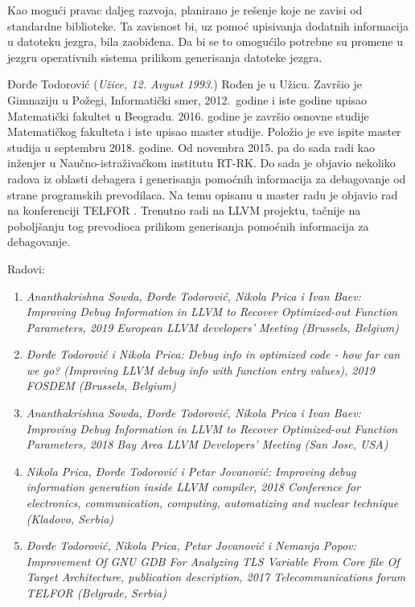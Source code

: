 \documentclass[12pt,oneside]{memoir}
\begin{document}
Kao mogući pravac daljeg razvoja, planirano je rešenje koje ne zavisi od standardne biblioteke. Ta zavisnost bi, uz pomoć upisivanja dodatnih informacija u datoteku jezgra, bila zaobiđena. Da bi se to omogućilo potrebne su promene u jezgru operativnih sistema prilikom generisanja datoteke jezgra.

\literatura

\backmatter

\begin{biografija}
Đorđe Todorović (\emph{Užice, 12. Avgust 1993.}) Rođen je u Užicu. Završio je Gimnaziju u Požegi, Informatički smer, 2012.~godine i iste godine upisao Matematički fakultet u Beogradu. 2016. godine je završio osnovne studije Matematičkog fakulteta i iste upisao master studije. Položio je sve ispite master studija u septembru 2018. godine. Od novembra 2015. pa do sada radi kao inženjer u Naučno-istraživačkom institutu RT-RK. Do sada je objavio nekoliko radova iz oblasti debagera i generisanja pomoćnih informacija za debagovanje od strane programskih prevodilaca. Na temu opisanu u master radu je objavio rad na konferenciji TELFOR \cite{TELFOR}. Trenutno radi na LLVM projektu, tačnije na poboljšanju tog prevodioca prilikom generisanja pomoćnih informacija za debagovanje.

Radovi:
\begin{enumerate}
	\item \emph{Ananthakrishna Sowda, Đorđe Todorović, Nikola Prica i Ivan Baev: Improving Debug Information in LLVM to Recover Optimized-out Function Parameters, 2019 European LLVM developers' Meeting (Brussels, Belgium)}
	\item \emph{Đorđe Todorović i Nikola Prica: Debug info in optimized code - how far can we go? (Improving LLVM debug info with function entry values), 2019 FOSDEM (Brussels, Belgium)}
	\item \emph{Ananthakrishna Sowda, Đorđe Todorović, Nikola Prica i Ivan Baev: Improving Debug Information in LLVM to Recover Optimized-out Function Parameters, 2018 Bay Area LLVM Developers' Meeting (San Jose, USA)}
	\item \emph{Nikola Prica, Đorđe Todorović i Petar Jovanović: Improving debug information generation inside LLVM compiler, 2018 Conference for electronics, communication, computing, automatizing and nuclear technique (Kladovo, Serbia)}
	\item \emph{Đorđe Todorović, Nikola Prica, Petar Jovanović i Nemanja Popov: Improvement Of GNU GDB For Analyzing TLS Variable From Core file Of Target Architecture, publication description, 2017 Telecommunications forum TELFOR (Belgrade, Serbia)}
\end{enumerate}

\end{biografija}
\end{document}
